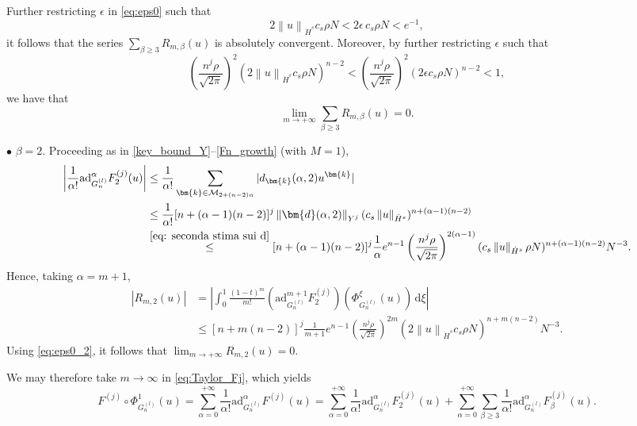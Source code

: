 \documentclass[a4paper,10pt,reqno]{article}
\theoremstyle{definition}
\theoremstyle{plain}
\theoremstyle{plain}
\theoremstyle{definition}
\theoremstyle{plain}
\theoremstyle{plain}
\theoremstyle{plain}
\theoremstyle{definition}
\theoremstyle{definition}
\newcommand{\norm}[1]{\left\lVert #1 \right\rVert}
\def \M{\mathcal{M}}
\def \k{\bm{k}}
\begin{document}
Further restricting $\epsilon$ in \eqref{eq:eps0} such that
\begin{equation}\label{eq:eps0_1}
2 \norm{u}_{\dot{H}^s} c_s \rho N < 2 \epsilon\, c_s \rho N < e^{-1},
\end{equation}
it follows that the series $\sum_{\beta \ge 3} R_{m,\beta} (u)$ is absolutely convergent. Moreover, by further restricting $\epsilon$ such that
\begin{equation}\label{eq:eps0_2}
\left ( \frac{n^j \rho}{\sqrt{2\pi}} \right )^2 (2 \norm{u}_{\dot{H}^s} c_s \rho N)^{n-2} < \left ( \frac{n^j \rho}{\sqrt{2\pi}} \right )^2 (2 \epsilon c_s \rho N)^{n-2}  < 1,
\end{equation}
we have that
\[
\lim_{m \to +\infty} \sum_{\beta \ge 3} R_{m,\beta}(u) = 0.
\]

\noindent $\bullet$ $\beta=2$. Proceeding as in \eqref{key_bound_Y}--\eqref{Fn_growth} (with $M=1$),
\begin{equation}\label{eq:est:ad_alpha_F_2}
\begin{split}
\left \lvert \frac{1}{\alpha!} \mathrm{ad}_{G_n^{(l)}}^{\alpha} F_2^{(j)}(u) \right \rvert &\le \frac{1}{\alpha!} \sum_{\k \in \M_{2+(n-2)\alpha}} |d_{\k}(\alpha,2) u^{\k}| \\
&\le \frac{1}{\alpha!} [n+(\alpha-1)(n-2)]^j \norm{\bm{d}(\alpha,2)}_{Y^j} (c_s \norm{u}_{\dot{H}^s})^{n+(\alpha-1)(n-2)} \\
&\stackrel{\eqref{eq: seconda stima sui d}}{\le} [n+(\alpha-1)(n-2)]^j \frac{1}{\alpha} e^{n-1} \left ( \frac{n^j \rho}{\sqrt{2\pi}} \right )^{2(\alpha-1)} (c_s \norm{u}_{\dot{H}^s} \rho N)^{n+(\alpha-1)(n-2)} N^{-3}.
\end{split}
\end{equation}
Hence, taking $\alpha=m+1$,
\[
\begin{split}
| R_{m,2}(u) | &= \left \lvert \int_0^1 \frac{(1-t)^m}{m!} ( \mathrm{ad}_{G_n^{(l)}}^{m+1} F_2^{(j)} )(\Phi_{G_n^{(l)}}^{\xi}(u)) \, \mathrm{d} \xi \right \rvert \\
&\le [n+m(n-2)]^j \frac{1}{m+1} e^{n-1} \left ( \frac{n^j \rho}{\sqrt{2\pi}} \right )^{2m} (2 \norm{u}_{\dot{H}^s} c_s \rho N)^{n+m(n-2)} N^{-3}. 
\end{split}
\]
Using \eqref{eq:eps0_2}, it follows that 
$\lim_{m \to +\infty} R_{m,2}(u) = 0$.

\medskip

We may therefore take $m\rightarrow\infty$ in \eqref{eq:Taylor_Fj}, which yields
\begin{equation}\label{eq:taylor_Fj}
F^{(j)} \circ \Phi_{G_n^{(l)}}^1 (u) = \sum_{\alpha = 0}^{+\infty} \frac{1}{\alpha !} \mathrm{ad}_{G_n^{(l)}}^{\alpha}F^{(j)} (u) = \sum_{\alpha = 0}^{+\infty} \frac{1}{\alpha !} \mathrm{ad}_{G_n^{(l)}}^{\alpha} F_2^{(j)}(u) + \sum_{\alpha = 0}^{+\infty} \sum_{\beta \ge 3} \frac{1}{\alpha !} \mathrm{ad}_{G_n^{(l)}}^{\alpha} F_{\beta}^{(j)}(u).
\end{equation}
\end{document}
